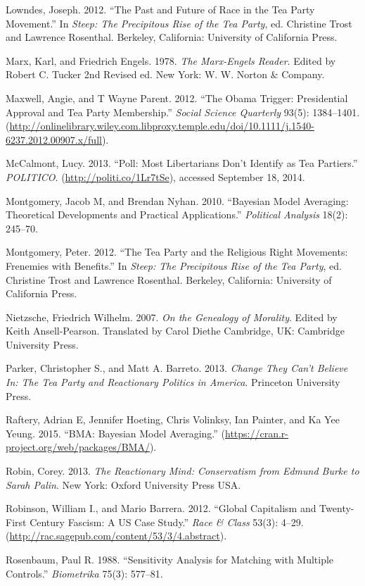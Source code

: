 \documentclass[12pt,]{article}
\begin{document}
Lowndes, Joseph. 2012. ``The Past and Future of Race in the Tea Party
Movement.'' In \emph{Steep: The Precipitous Rise of the Tea Party}, ed.
Christine Trost and Lawrence Rosenthal. Berkeley, California: University
of California Press.

Marx, Karl, and Friedrich Engels. 1978. \emph{The Marx-Engels Reader}.
Edited by Robert C. Tucker 2nd Revised ed. New York: W. W. Norton \&
Company.

Maxwell, Angie, and T Wayne Parent. 2012. ``The Obama Trigger:
Presidential Approval and Tea Party Membership.'' \emph{Social Science
Quarterly} 93(5): 1384--1401.
(\url{http://onlinelibrary.wiley.com.libproxy.temple.edu/doi/10.1111/j.1540-6237.2012.00907.x/full}).

McCalmont, Lucy. 2013. ``Poll: Most Libertarians Don't Identify as Tea
Partiers.'' \emph{POLITICO}. (\url{http://politi.co/1Lr7tSe}), accessed
September 18, 2014.

Montgomery, Jacob M, and Brendan Nyhan. 2010. ``Bayesian Model
Averaging: Theoretical Developments and Practical Applications.''
\emph{Political Analysis} 18(2): 245--70.

Montgomery, Peter. 2012. ``The Tea Party and the Religious Right
Movements: Frenemies with Benefits.'' In \emph{Steep: The Precipitous
Rise of the Tea Party}, ed. Christine Trost and Lawrence Rosenthal.
Berkeley, California: University of California Press.

Nietzsche, Friedrich Wilhelm. 2007. \emph{On the Genealogy of Morality}.
Edited by Keith Ansell-Pearson. Translated by Carol Diethe Cambridge,
UK: Cambridge University Press.

Parker, Christopher S., and Matt A. Barreto. 2013. \emph{Change They
Can't Believe In: The Tea Party and Reactionary Politics in America}.
Princeton University Press.

Raftery, Adrian E, Jennifer Hoeting, Chris Volinksy, Ian Painter, and Ka
Yee Yeung. 2015. ``BMA: Bayesian Model Averaging.''
(\url{https://cran.r-project.org/web/packages/BMA/}).

Robin, Corey. 2013. \emph{The Reactionary Mind: Conservatism from Edmund
Burke to Sarah Palin}. New York: Oxford University Press USA.

Robinson, William I., and Mario Barrera. 2012. ``Global Capitalism and
Twenty-First Century Fascism: A US Case Study.'' \emph{Race \& Class}
53(3): 4--29. (\url{http://rac.sagepub.com/content/53/3/4.abstract}).

Rosenbaum, Paul R. 1988. ``Sensitivity Analysis for Matching with
Multiple Controls.'' \emph{Biometrika} 75(3): 577--81.
\end{document}
